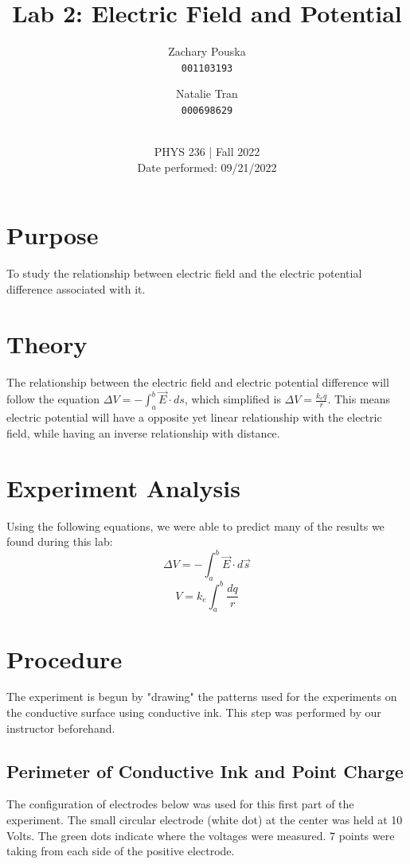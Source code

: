 \documentclass[titlepage]{article}
\begin{document}
\title{\textbf{Lab 2: Electric Field and Potential}}
\author{
    Zachary Pouska\\
    \texttt{001103193}\\
    \and
    Natalie Tran \\ 
    \texttt{000698629}\\ \\
} 

\date{PHYS 236 | Fall 2022\\
Date performed: 09/21/2022}


	\maketitle



	\section{Purpose}
	To study the relationship between electric field and the electric potential difference associated with it.
	\section{Theory}	
	The relationship between the electric field and electric potential difference will follow the equation \(\Delta V = -\int_{a}^{b} \vec{E} \cdot ds\), which simplified is \(\Delta V = \frac{k_{e}q}{r}\). This means electric potential will have a opposite yet linear relationship with the electric field, while having an inverse relationship with distance.
	\section{Experiment Analysis}
    
    Using the following equations, we were able to predict many of the results we found during this lab:
    $$\Delta V = -\int_a^b \vec{E}\cdot d\vec{s} $$
    $$V= k_e \int_a^b \frac{dq}{r} $$




	\section{Procedure}
    The experiment is begun by "drawing" the patterns used for the experiments on the conductive surface using conductive ink. This step was performed by our instructor beforehand. 
    \subsection{Perimeter of Conductive Ink and Point Charge}
    The configuration of electrodes below was used for this first part of the experiment. The small circular electrode (white dot) at the center was held at 10 Volts. The green dots indicate where the voltages were measured. 7 points were taking from each side of the positive electrode.
\end{document}
